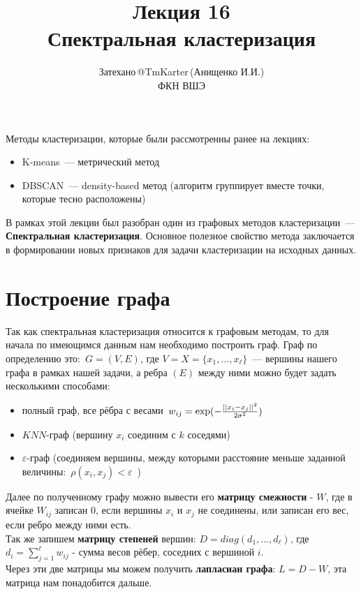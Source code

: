 \documentclass[12pt,fleqn]{article}
\begin{document}
\title{Лекция 16\\Спектральная кластеризация}
\author{Затехано\,@TmKarter\,(Анищенко И.И.)\\ФКН ВШЭ}
\maketitle

Методы кластеризации, которые были рассмотренны ранее на лекциях:

\begin{itemize}
	\item K-means~--- метрический метод
	\item DBSCAN~--- density-based метод (алгоритм группирует вместе точки, которые тесно расположены)
\end{itemize}

В рамках этой лекции был разобран один из графовых методов кластеризации~--- {\bf Спектральная кластеризация}. Основное полезное свойство метода заключается в формировании новых признаков для задачи кластеризации на исходных данных.

\section{Построение графа}
Так как спектральная кластеризация относится к графовым методам, то для начала по имеющимся данным нам необходимо построить граф. Граф по определению это:~$G=(V,E)$, где $V=X=\{x_1,...,x_{\ell}\}$~--- вершины нашего графа в рамках нашей задачи, а ребра $(E)$ между ними можно будет задать несколькими способами:

\begin{itemize}
	\item полный граф, все рёбра с весами~$w_{ij} = \large\exp(-\frac{||x_i - x_j||^2}{2\sigma^2})$~
	\item $KNN$-граф (вершину $x_i$ соединим с $k$ соседями)
	\item $\varepsilon$-граф (соединяем вершины, между которыми расстояние меньше заданной величины:~$\rho(x_i,x_j)<\varepsilon$~)
\end{itemize}

Далее по полученному графу можно вывести его {\bf матрицу смежности} - $W$, где в ячейке $W_{ij}$ записан $0$, если вершины $x_i$ и $x_j$ не соединены, или записан его вес, если ребро между ними есть.\\
Так же запишем {\bf матрицу степеней} вершин: $D=diag(d_1,...,d_{\ell})$, где $d_i = \sum^{\ell}_{j=1}w_{ij}$ - сумма весов рёбер, соседних с вершиной $i$.\\
Через эти две матрицы мы можем получить {\bf лапласиан графа}: $L = D - W$, эта матрица нам понадобится дальше.
\end{document}
